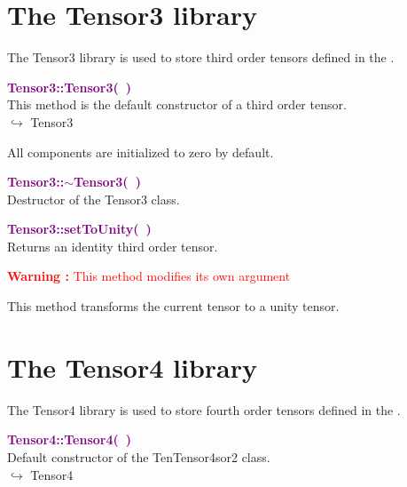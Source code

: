 \section{The Tensor3 library}

The Tensor3 library is used to store third order tensors defined in the \DynELA.

\textcolor{purple}{\textbf{Tensor3::Tensor3(~)}}\label{Tensor3::Tensor3()}\\
This method is the default constructor of a third order tensor.\\ \hspace*{10mm}$\hookrightarrow$ Tensor3

All components are initialized to zero by default.

\textcolor{purple}{\textbf{Tensor3::$\sim$Tensor3(~)}}\label{Tensor3::~Tensor3()}\\
Destructor of the Tensor3 class.


\textcolor{purple}{\textbf{Tensor3::setToUnity(~)}}\label{Tensor3::setToUnity()}\\
Returns an identity third order tensor.

\hspace*{10mm}\textcolor{red}{\textbf{Warning :} This method modifies its own argument}

This method transforms the current tensor to a unity tensor.

\section{The Tensor4 library}

The Tensor4 library is used to store fourth order tensors defined in the \DynELA.

\textcolor{purple}{\textbf{Tensor4::Tensor4(~)}}\label{Tensor4::Tensor4()}\\
Default constructor of the TenTensor4sor2 class.\\ \hspace*{10mm}$\hookrightarrow$ Tensor4


